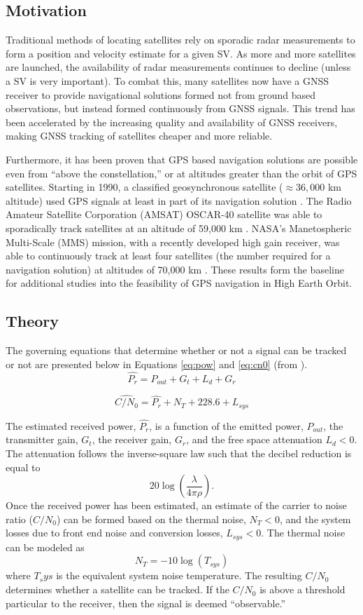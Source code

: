 \documentclass[11pt]{article}
\newcommand{\cnr}{C/N_0}
\begin{document}
\subsection{Motivation}
Traditional methods of locating satellites rely on sporadic radar measurements to form a position and velocity estimate for a given SV. As more and more satellites are launched, the availability of radar measurements continues to decline (unless a SV is very important). To combat this, many satellites now have a GNSS receiver to provide navigational solutions formed not from ground based observations, but instead formed continuously from GNSS signals. This trend has been accelerated by the increasing quality and availability of GNSS receivers, making GNSS tracking of satellites cheaper and more reliable.

Furthermore, it has been proven that GPS based navigation solutions are possible even from ``above the constellation,'' or at altitudes greater than the orbit of GPS satellites. Starting in 1990, a classified geosynchronous satellite ($\approx 36,000$ km altitude) used GPS signals at least in part of its navigation solution \cite{class}. The Radio Amateur Satellite Corporation (AMSAT) OSCAR-40 satellite was able to sporadically track satellites at an altitude of 59,000 km \cite{ao40}. NASA's Manetospheric Multi-Scale (MMS) mission, with a recently developed high gain receiver, was able to continuously track at least four satellites (the number required for a navigation solution) at altitudes of 70,000 km \cite{ssv}. These results form the baseline for additional studies into the feasibility of GPS navigation in High Earth Orbit.

\subsection{Theory}
The governing equations that determine whether or not a signal can be tracked or not are presented below in Equations \ref{eq:pow} and \ref{eq:cn0} (from \cite{ao40}).
\begin{equation}
\hat{P_r} = P_{out} + G_t + L_d + G_r
\label{eq:pow}
\end{equation}

\begin{equation}
\widehat{C/N_0} = \hat{P_r} + N_T + 228.6 + L_{sys}
\label{eq:cn0}
\end{equation}

The estimated received power, $\hat{P_r}$, is a function of the emitted power, $P_{out}$, the transmitter gain, $G_t$, the receiver gain, $G_r$, and the free space attenuation $L_d < 0$. The attenuation follows the inverse-square law such that the decibel reduction is equal to \[ 20\log(\frac{\lambda}{4\pi \rho}). \] Once the received power has been estimated, an estimate of the carrier to noise ratio ($\cnr$) can be formed based on the thermal noise, $N_T < 0$, and the system losses due to front end noise and conversion losses, $L_{sys} < 0$. The thermal noise can be modeled as \[ N_T = -10 \log(T_{sys})\] where $T_sys$ is the equivalent system noise temperature. The resulting $\cnr$ determines whether a satellite can be tracked. If the $\cnr$ is above a threshold particular to the receiver, then the signal is deemed ``observable.'' 
\end{document}

